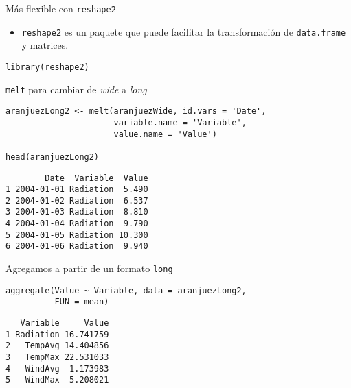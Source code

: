\documentclass[xcolor={usenames,svgnames,dvipsnames}]{beamer}
\begin{document}
\begin{frame}[label={sec:org3cf6c3a},fragile]{Más flexible con \texttt{reshape2}}
 \begin{itemize}
\item \texttt{reshape2} es un paquete que puede facilitar la transformación de \texttt{data.frame} y matrices.
\end{itemize}

\lstset{language=r,label= ,caption= ,captionpos=b,numbers=none}
\begin{lstlisting}
library(reshape2)
\end{lstlisting}
\end{frame}

\begin{frame}[label={sec:orgdf9896f},fragile]{\texttt{melt} para cambiar de \emph{wide} a \emph{long}}
 \lstset{language=r,label= ,caption= ,captionpos=b,numbers=none}
\begin{lstlisting}
aranjuezLong2 <- melt(aranjuezWide, id.vars = 'Date',
                      variable.name = 'Variable',
                      value.name = 'Value')

head(aranjuezLong2)
\end{lstlisting}

\begin{verbatim}
        Date  Variable  Value
1 2004-01-01 Radiation  5.490
2 2004-01-02 Radiation  6.537
3 2004-01-03 Radiation  8.810
4 2004-01-04 Radiation  9.790
5 2004-01-05 Radiation 10.300
6 2004-01-06 Radiation  9.940
\end{verbatim}
\end{frame}

\begin{frame}[label={sec:orgeee8529},fragile]{Agregamos a partir de un formato \texttt{long}}
 \lstset{language=r,label= ,caption= ,captionpos=b,numbers=none}
\begin{lstlisting}
aggregate(Value ~ Variable, data = aranjuezLong2,
          FUN = mean)
\end{lstlisting}

\begin{verbatim}
   Variable     Value
1 Radiation 16.741759
2   TempAvg 14.404856
3   TempMax 22.531033
4   WindAvg  1.173983
5   WindMax  5.208021
\end{verbatim}
\end{frame}
\end{document}
